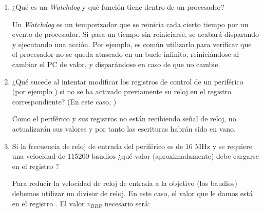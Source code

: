 \documentclass[svgnames,spanish,11pt,a4paper]{article}
\newcounter{solution}
\begin{document}
\begin{enumerate}
            \begin{solution}
                Al tener tantos periféricos en un microcontrolador moderno, mantener todos activos todo el tiempo sería ineficiente desde el punto de vista energético. Se aplican técnicas que aíslan los relojes de cada periférico, haciendo que su consumo sea cero en caso de no estar activos. Por tanto, en el caso de intentar acceder a un registro (especialmente en escritura), estos accesos no tendrán efecto, o devolverán datos basura.
            \end{solution}


        \item ¿Qué es un \emph{Watchdog} y qué función tiene dentro de un procesador?
        
            \begin{solution}
                Un \emph{Watchdog} es un temporizador que se reinicia cada cierto tiempo por un evento de procesador. Si pasa un tiempo sin reiniciarse, se acabará disparando y ejecutando una acción. Por ejemplo, es común utilizarlo para verificar que el procesador no se queda atascado en un bucle infinito, reiniciándose al cambiar el PC de valor, y disparándose en caso de que no cambie.
            \end{solution}

        \item ¿Qué sucede al intentar modificar los registros de control de un periférico (por ejemplo ) si no se ha activado previamente su reloj en el registro  correspondiente? (En este caso, )

            \begin{solution}
                Como el periférico y sus registros no están recibiendo señal de reloj, no actualizarán sus valores y por tanto las escrituras habrán sido en vano.
            \end{solution}

        \item Si la frecuencia de reloj de entrada del periférico  es de $16\text{ MHz}$ y se requiere una velocidad de $115200\text{ baudios}$ ¿qué valor (aproximadamente) debe cargarse en el registro ?
        
            \begin{solution}
                Para reducir la velocidad de reloj de entrada a la objetivo (los baudios) debemos utilizar un divisor de reloj. En este caso, el valor que le damos está en el registro . El valor $v_{BRR}$ necesario será:


\end{solution}
\end{enumerate}
\end{document}
